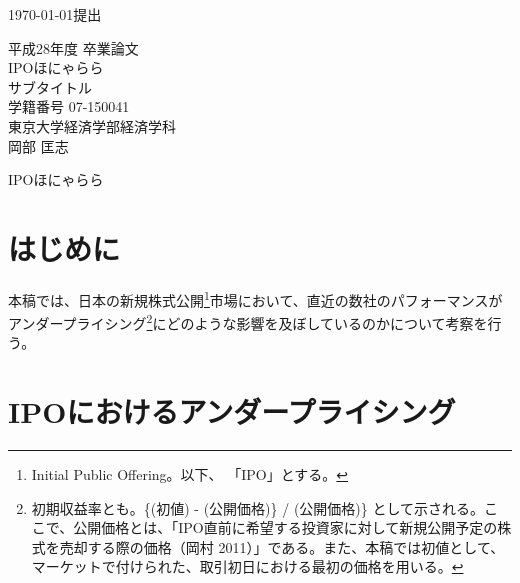 \documentclass{jsarticle}
\begin{document}
\renewcommand\thefootnote{\arabic{footnote})}



{\Large \today 提出}\\ %

\begin{center}
\vspace{120truept}
{\huge 平成28年度 卒業論文\\[10mm]
IPOほにゃらら}\\ %
\vspace{10truept}
{\Large サブタイトル}\\ %
\vspace{120truept}
{\huge 学籍番号 07-150041}\\ %
\vspace{50truept}
{\huge 東京大学経済学部経済学科\\[50truept]
岡部 匡志}\\ %

\end{center}
\newpage
\begin{center}
{\Large IPOほにゃらら}\\ %
\end{center}

\tableofcontents
\vspace{120truept}
\section{はじめに}
本稿では、日本の新規株式公開\footnote[1]{Initial Public Offering。以下、 「IPO」とする。}市場において、直近の数社のパフォーマンスがアンダープライシング\footnote[2]{初期収益率とも。\{(初値) - (公開価格)\} / (公開価格)\} として示される。ここで、公開価格とは、「IPO直前に希望する投資家に対して新規公開予定の株式を売却する際の価格（岡村 2011\cite{okamura}）」である。また、本稿では初値として、マーケットで付けられた、取引初日における最初の価格を用いる。}にどのような影響を及ぼしているのかについて考察を行う。
\section{IPOにおけるアンダープライシング}
\end{document}
